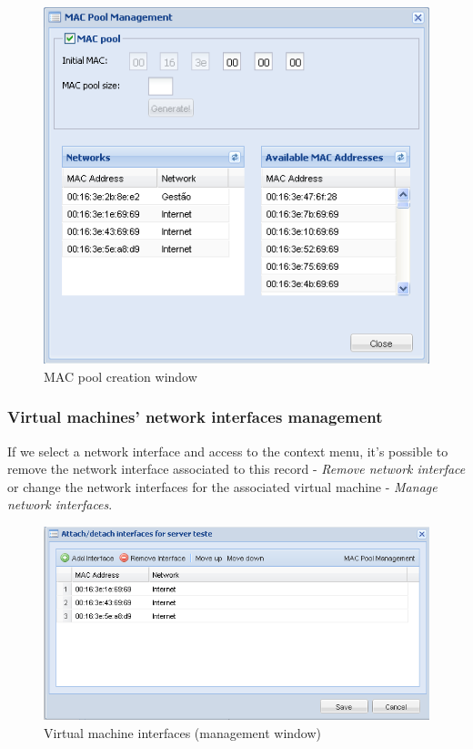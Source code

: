 \begin{figure}[H]
	\begin{center}
	\includegraphics[scale=0.5]{screenshots/networks_macpool.png}
	\caption{MAC pool creation window}
	\label{fig:networks_macpool}
	\end{center}
\end{figure}


\subsubsection{Virtual machines' network interfaces management}
If we select a network interface and access to the context menu, it's possible to remove the network interface associated to this record - \emph{Remove network interface} or change the network interfaces for the associated virtual machine - \emph{Manage network interfaces}.

\begin{figure}[H]
	\begin{center}
	\includegraphics[scale=0.5]{screenshots/nics.png}
	\caption{Virtual machine interfaces (management window)}
	\label{fig:nics}
	\end{center}
\end{figure}

